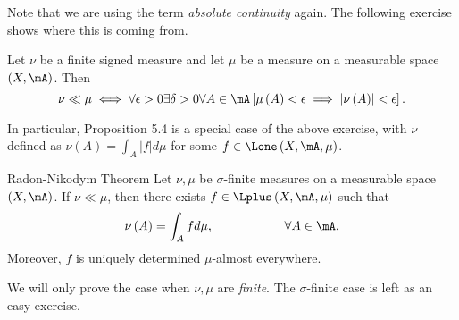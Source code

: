 \documentclass[pmath451]{subfiles}
\begin{document}
    \np Note that we are using the term \textit{absolute continuity} again. The following exercise shows where this is coming from.

    \begin{exercise}{}
        Let $\nu$ be a finite signed measure and let $\mu$ be a measure on a measurable space $\left( X,\mA \right)$. Then
        \begin{equation*}
            \nu\ll\mu \iff \forall\epsilon>0\exists\delta>0\forall A\in\mA\left[ \mu\left( A \right)<\epsilon\implies \left| \nu\left( A \right) \right|<\epsilon \right].
        \end{equation*}
    \end{exercise}

    \rruleline

    \np In particular, Proposition 5.4 is a special case of the above exercise, with $\nu$ defined as $\nu\left( A \right) = \int_A\left| f \right|d\mu$ for some $f\in\Lone\left( X,\mA,\mu \right)$.
    
    \begin{theorem}{Radon-Nikodym Theorem}
        Let $\nu,\mu$ be $\sigma$-finite measures on a measurable space $\left( X,\mA \right)$. If $\nu\ll\mu$, then there exists $f\in\Lplus\left( X,\mA,\mu \right)$ such that
        \begin{equation*}
            \nu\left( A \right) = \int_Afd\mu, \hspace{2cm}\forall A\in\mA.
        \end{equation*}
        Moreover, $f$ is uniquely determined $\mu$-almost everywhere.
    \end{theorem}

    \np We will only prove the case when $\nu,\mu$ are \textit{finite}. The $\sigma$-finite case is left as an easy exercise.
    
\end{document}

